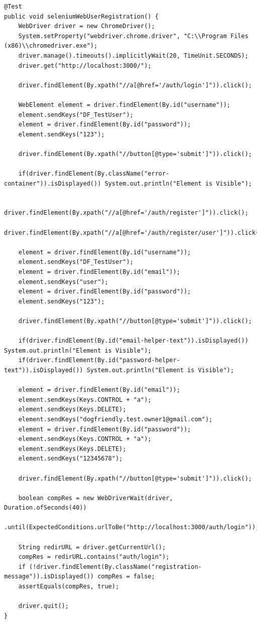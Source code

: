         \begin{lstlisting}
@Test
public void seleniumWebUserRegistration() {
    WebDriver driver = new ChromeDriver();
    System.setProperty("webdriver.chrome.driver", "C:\\Program Files (x86)\\chromedriver.exe");
    driver.manage().timeouts().implicitlyWait(20, TimeUnit.SECONDS);
    driver.get("http://localhost:3000/");

    driver.findElement(By.xpath("//a[@href='/auth/login']")).click();

    WebElement element = driver.findElement(By.id("username"));
    element.sendKeys("DF_TestUser");
    element = driver.findElement(By.id("password"));
    element.sendKeys("123");

    driver.findElement(By.xpath("//button[@type='submit']")).click();

    if(driver.findElement(By.className("error-container")).isDisplayed()) System.out.println("Element is Visible");

    driver.findElement(By.xpath("//a[@href='/auth/register']")).click();
    driver.findElement(By.xpath("//a[@href='/auth/register/user']")).click();

    element = driver.findElement(By.id("username"));
    element.sendKeys("DF_TestUser");
    element = driver.findElement(By.id("email"));
    element.sendKeys("user");
    element = driver.findElement(By.id("password"));
    element.sendKeys("123");

    driver.findElement(By.xpath("//button[@type='submit']")).click();

    if(driver.findElement(By.id("email-helper-text")).isDisplayed()) System.out.println("Element is Visible");
    if(driver.findElement(By.id("password-helper-text")).isDisplayed()) System.out.println("Element is Visible");

    element = driver.findElement(By.id("email"));
    element.sendKeys(Keys.CONTROL + "a");
    element.sendKeys(Keys.DELETE);
    element.sendKeys("dogfriendly.test.owner1@gmail.com");
    element = driver.findElement(By.id("password"));
    element.sendKeys(Keys.CONTROL + "a");
    element.sendKeys(Keys.DELETE);
    element.sendKeys("12345678");

    driver.findElement(By.xpath("//button[@type='submit']")).click();

    boolean compRes = new WebDriverWait(driver, Duration.ofSeconds(40))
            .until(ExpectedConditions.urlToBe("http://localhost:3000/auth/login"));

    String redirURL = driver.getCurrentUrl();
    compRes = redirURL.contains("auth/login");
    if (!driver.findElement(By.className("registration-message")).isDisplayed()) compRes = false;
    assertEquals(compRes, true);

    driver.quit();
}
        \end{lstlisting}

